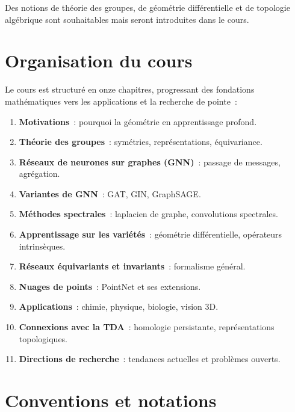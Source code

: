 Des notions de th\'eorie des groupes, de g\'eom\'etrie diff\'erentielle et de topologie
alg\'ebrique sont souhaitables mais seront introduites dans le cours.

\section*{Organisation du cours}

Le cours est structur\'e en onze chapitres, progressant des fondations
math\'ematiques vers les applications et la recherche de pointe~:

\begin{enumerate}
    \item \textbf{Motivations}~: pourquoi la g\'eom\'etrie en apprentissage profond.
    \item \textbf{Th\'eorie des groupes}~: sym\'etries, repr\'esentations, \'equivariance.
    \item \textbf{R\'eseaux de neurones sur graphes (GNN)}~: passage de messages,
          agr\'egation.
    \item \textbf{Variantes de GNN}~: GAT, GIN, GraphSAGE.
    \item \textbf{M\'ethodes spectrales}~: laplacien de graphe, convolutions spectrales.
    \item \textbf{Apprentissage sur les vari\'et\'es}~: g\'eom\'etrie diff\'erentielle,
          op\'erateurs intrins\`eques.
    \item \textbf{R\'eseaux \'equivariants et invariants}~: formalisme g\'en\'eral.
    \item \textbf{Nuages de points}~: PointNet et ses extensions.
    \item \textbf{Applications}~: chimie, physique, biologie, vision 3D.
    \item \textbf{Connexions avec la TDA}~: homologie persistante, repr\'esentations
          topologiques.
    \item \textbf{Directions de recherche}~: tendances actuelles et probl\`emes ouverts.
\end{enumerate}

\section*{Conventions et notations}

